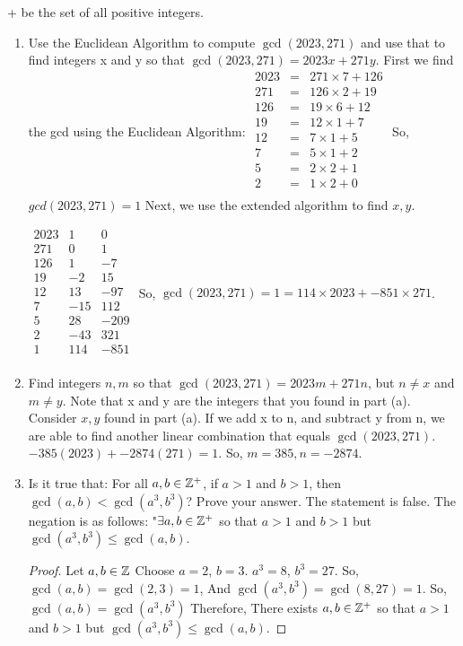 \documentclass{article}
\begin{document}
\begin{enumerate}
+ be the set of all positive integers.
\begin{enumerate}[label=(\alph*)]
\item Use the Euclidean Algorithm to compute $\gcd (2023, 271)$ and use that to find integers x
and y so that $\gcd (2023, 271) = 2023 x + 271 y$. \nl
\nl First we find the gcd using the Euclidean Algorithm: \nl
$
 \begin{array}{lcl} 
 2023 & = & 271 \times 7 + 126\\ 
 271 & = & 126 \times 2 + 19\\ 
 126 & = & 19 \times 6 + 12\\ 
 19 & = & 12 \times 1 + 7\\ 
 12 & = & 7 \times 1 + 5\\
 7 & = & 5 \times 1 + 2\\
 5 & = & 2 \times 2 + 1\\
 2 & = & 1 \times 2 + 0\\
 \end{array}
$
\nl\nl So, $gcd (2023,271) = 1$ 
\nl Next, we use the extended algorithm to find $x, y$. \nl 

$
\begin{array}{lcl}
2023 & 1 &0\\
271 &0&1\\ 
126 &1&-7\\ 
19 & -2 & 15\\ 
12 &13 & -97\\ 
7 & -15&112\\ 
5 & 28 & -209\\ 
2 & -43 & 321 \\
1 & 114 & -851\\
\end{array}
$
\nl \nl So, $\gcd(2023,271) = 1 = 114 \times2023 + -851 \times271$. \nl 
\newpage
\item Find integers $n,m$  so that $\gcd(2023, 271) = 2023 m + 271 n$, but $n \neq x$ and $m \neq y$.
Note that x and y are the integers that you found in part (a).
\nl 
\nl Consider $x, y$ found in part (a). If we add x to n, and subtract y from n, we are able to 
find another linear combination that equals $\gcd(2023, 271)$. $-385(2023)+-2874(271) = 1$.
\nl So, $m = 385, n = -2874$.

\item Is it true that: For all $a, b \in\mathbb{Z}^+$, if $a > 1$ and $b > 1$, 
then $\gcd(a, b) < \gcd(a^3,b^3)$? \nl
Prove your answer.
\nl \nl The statement is false.
\nl The negation is as follows: "$\exists a,b\in\mathbb{Z}^+$ so that $a>1$ and $b>1$ but $\gcd(a^3,b^3)\leq\gcd(a,b)$.
\begin{proof}
    Let $a,b \in\mathbb{Z}$
    \nl Choose $a=2$, $ b=3$.
    \nl $a^3=8$, $b^3 =27$. 
    \nl So, $\gcd(a,b) = \gcd(2,3) = 1$, 
    \nl And $\gcd(a^3,b^3) = \gcd(8,27) = 1$.
    \nl So, $\gcd(a,b)=\gcd(a^3,b^3)$
    \nl Therefore, There exists $ a,b\in\mathbb{Z}^+$ so that $a>1$ and $b>1$ but $\gcd(a^3,b^3)\leq\gcd(a,b)$.


\end{proof}
\end{enumerate}
\end{enumerate}
\end{document}
